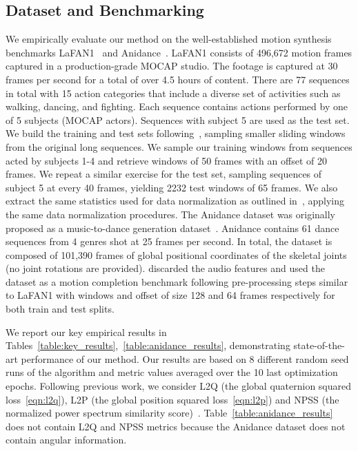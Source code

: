 \documentclass[letterpaper]{article} \usepackage[]{aaai23}  \usepackage{times}  \usepackage{helvet}  \usepackage{courier}  \usepackage[hyphens]{url}  \usepackage{graphicx} \urlstyle{rm} \def\UrlFont{\rm}  \usepackage{natbib}  \usepackage{caption} \frenchspacing  \setlength{\pdfpagewidth}{8.5in} \setlength{\pdfpageheight}{11in}
\begin{document}
\subsection{Dataset and Benchmarking} 
We empirically evaluate our method on the well-established motion synthesis benchmarks LaFAN1~\cite{harvey2020robust} and Anidance~\cite{tang2018}. LaFAN1 consists of 496,672 motion frames captured in a production-grade MOCAP studio. The footage is captured at 30 frames per second for a total of over 4.5 hours of content. There are 77 sequences in total with 15 action categories that include a diverse set of activities such as walking, dancing, and fighting. Each sequence contains actions performed by one of 5 subjects (MOCAP actors). Sequences with subject 5 are used as the test set. We build the training and test sets following~\citet{harvey2020robust}, sampling smaller sliding windows from the original long sequences. We sample our training windows from sequences acted by subjects 1-4 and retrieve windows of 50 frames with an offset of 20 frames. We repeat a similar exercise for the test set, sampling sequences of subject 5 at every 40 frames, yielding 2232 test windows of 65 frames. We also extract the same statistics used for data normalization as outlined in~\citep{harvey2020robust}, applying the same data normalization procedures. 
The Anidance dataset was originally proposed as a music-to-dance generation dataset~\citep{tang2018}. Anidance contains 61 dance sequences from 4 genres shot at 25 frames per second. In total, the dataset is composed of 101,390 frames of global positional coordinates of the skeletal joints (no joint rotations are provided). \citet{duan2021singleshot} discarded the audio features and used the dataset as a motion completion benchmark following pre-processing steps similar to LaFAN1 with windows and offset of size 128 and 64 frames respectively for both train and test splits. 

We report our key empirical results in Tables~\ref{table:key_results},~\ref{table:anidance_results}, demonstrating state-of-the-art performance of our method. Our results are based on 8 different random seed runs of the algorithm and metric values averaged over the 10 last optimization epochs. Following previous work, we consider L2Q (the global quaternion squared loss~\eqref{eqn:l2q}), L2P (the global position squared loss~\eqref{eqn:l2p}) and NPSS (the normalized power spectrum similarity score)~\cite{gopalakrishnan2019neural}. Table~\ref{table:anidance_results} does not contain L2Q and NPSS metrics because the Anidance dataset does not contain angular information.
\end{document}

